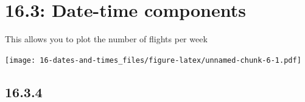 \documentclass[]{book}
\newenvironment{Shaded}{\begin{snugshade}}{\end{snugshade}}
\newcommand{\DataTypeTok}[1]{\textcolor[rgb]{0.13,0.29,0.53}{#1}}
\newcommand{\KeywordTok}[1]{\textcolor[rgb]{0.13,0.29,0.53}{\textbf{#1}}}
\newcommand{\NormalTok}[1]{#1}
\newcommand{\OperatorTok}[1]{\textcolor[rgb]{0.81,0.36,0.00}{\textbf{#1}}}
\newcommand{\StringTok}[1]{\textcolor[rgb]{0.31,0.60,0.02}{#1}}
\theoremstyle{definition}
\theoremstyle{definition}
\theoremstyle{definition}
\theoremstyle{remark}
\begin{document}
\hypertarget{date-time-components}{%
\section{16.3: Date-time components}\label{date-time-components}}

This allows you to plot the number of flights per week

\begin{Shaded}
\end{Shaded}

\texttt{[image: 16-dates-and-times\_files/figure-latex/unnamed-chunk-6-1.pdf]}

\hypertarget{section-57}{%
\subsection{16.3.4}\label{section-57}}
\end{document}
